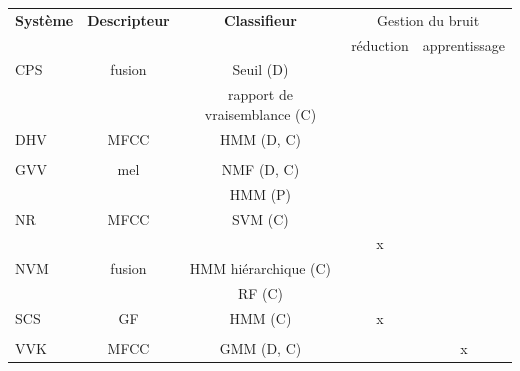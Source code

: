 \begin{table}[t]
\begin{center}
\tiny
\begin{tabular}{lcccc}
\textbf{Système}                    & \textbf{Descripteur} & \textbf{Classifieur}         & \multicolumn{2}{c}{Gestion du bruit}  \\ 
                                    &                      &                              & réduction & apprentissage  \\ 
\hline
CPS                                 & fusion               & Seuil \hfill (D)             &           &             \\ 
\citep{CPS}                         &                      & rapport de vraisemblance \hfill (C)  &           &             \\ 
\hline         
DHV                                 & MFCC                 & HMM \hfill  (D, C)           &           &              \\ 
\citep{diment2013sound,DHV}         &                      &                              &           &             \\ 
\hline 
GVV                                 & mel                  & NMF \hfill  (D, C)           &           &              \\
\citep{gemmeke2013exemplar,GVV}     &                      & HMM \hfill  (P)              &           &             \\                      
\hline
NR                                  & MFCC                 & SVM \hfill   (C)             &           &             \\
\citep{roma2013recurrence,NR2}      &                      &                              & x         &             \\    
\hline
NVM                                 & fusion               & HMM hiérarchique \hfill  (C) &           &            \\     
\citep{niessen2013hierarchical,NVM} &                      & RF  \hfill (C)               &           &            \\     
\hline
SCS                                 & GF                   & HMM \hfill  (C)              & x         &               \\  
\citep{schroder2013use,SCS}         &                      &                              &           &             \\    
\hline  
VVK                                 & MFCC                 & GMM \hfill  (D, C)           &           & x            \\ 

\end{tabular}
\end{center}
\end{table}
